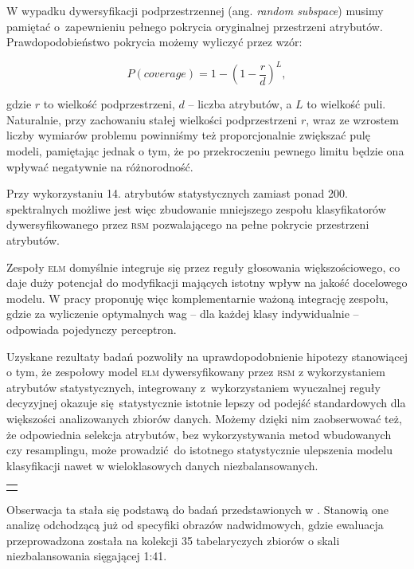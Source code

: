 W wypadku dywersyfikacji podprzestrzennej (ang. \emph{random subspace}) musimy pamiętać o~zapewnieniu pełnego pokrycia oryginalnej przestrzeni atrybutów. Prawdopodobieństwo pokrycia możemy wyliczyć przez wzór:

\begin{equation}
	P(coverage) = 1 - (1-\frac{r}{d})^L,
\end{equation}

\noindent gdzie $r$ to wielkość podprzestrzeni, $d$ -- liczba atrybutów, a $L$ to wielkość puli. Naturalnie, przy zachowaniu stałej wielkości podprzestrzeni $r$, wraz ze wzrostem liczby wymiarów problemu powinniśmy też proporcjonalnie zwiększać pulę modeli, pamiętając jednak o tym, że po przekroczeniu pewnego limitu będzie ona wpływać negatywnie na różnorodność.

Przy wykorzystaniu 14. atrybutów statystycznych zamiast ponad 200. spektralnych możliwe jest więc zbudowanie mniejszego zespołu klasyfikatorów dywersyfikowanego przez \textsc{rsm} pozwalającego na pełne pokrycie przestrzeni atrybutów.

Zespoły \textsc{elm} domyślnie integruje się przez reguły głosowania większościowego, co daje duży potencjał do modyfikacji mających istotny wpływ na jakość docelowego modelu. W pracy proponuję więc komplementarnie ważoną integrację zespołu, gdzie za wyliczenie optymalnych wag -- dla każdej klasy indywidualnie -- odpowiada pojedynczy perceptron.

Uzyskane rezultaty badań pozwoliły na uprawdopodobnienie hipotezy stanowiącej o tym, że zespołowy model \textsc{elm} dywersyfikowany przez \textsc{rsm} z wykorzystaniem atrybutów statystycznych, integrowany z~wykorzystaniem wyuczalnej reguły decyzyjnej okazuje się statystycznie istotnie lepszy od podejść standardowych dla większości analizowanych zbiorów danych. Możemy dzięki nim zaobserwować też, że odpowiednia selekcja atrybutów, bez wykorzystywania metod wbudowanych czy resamplingu, może prowadzić do istotnego statystycznie ulepszenia modelu klasyfikacji nawet w wieloklasowych danych niezbalansowanych.\vspace{1em}

{
\color{red}
\noindent\begin{tabular}{p{\textwidth}}
	\toprule &
\end{tabular}\vspace{-1em}
}
\noindent Obserwacja ta stała się podstawą do badań przedstawionych w . Stanowią one analizę odchodzącą już od specyfiki obrazów nadwidmowych, gdzie ewaluacja przeprowadzona została na kolekcji 35 tabelaryczych zbiorów o skali niezbalansowania sięgającej 1:41. 

